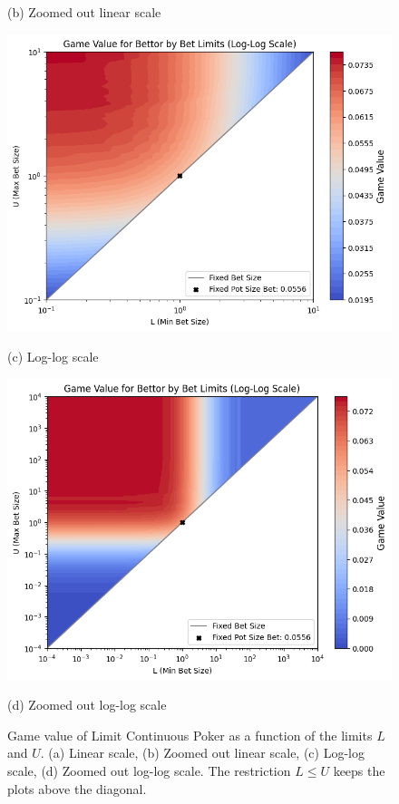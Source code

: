 \documentclass[a4paper,12pt]{article}
\theoremstyle{plain}
\theoremstyle{definition}
\begin{document}
\begin{figure}[h!]
\begin{adjustwidth}{-1in}{-1in}
\begin{minipage}{0.6\textwidth}
            \caption*{(b) Zoomed out linear scale}
        \end{minipage}
        \vspace{0.5cm}
        \begin{minipage}{0.6\textwidth}
            \centering
            \includegraphics[width=\textwidth]{value_LU_log.png}
            \caption*{(c) Log-log scale}
        \end{minipage}
        \hspace{0.05\textwidth}
        \begin{minipage}{0.6\textwidth}
            \centering
            \includegraphics[width=\textwidth]{value_LU_log_big.png}
            \caption*{(d) Zoomed out log-log scale}
        \end{minipage}
    \end{adjustwidth}
    \caption{Game value of Limit Continuous Poker as a function of the limits $L$ and $U$. (a) Linear scale, (b) Zoomed out linear scale, (c) Log-log scale, (d) Zoomed out log-log scale. The restriction $L \leq U$ keeps the plots above the diagonal.}
    \label{fig:payoffs_vs_LU_combined}
\end{figure}
\end{document}
